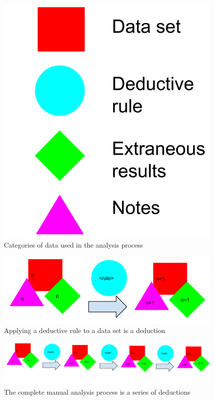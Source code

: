 \begin{figure}
  \includegraphics[scale=0.6]{figures/data_key}
  \caption{Categories of data used in the analysis process}
  \label{data_key}
\end{figure}

\begin{figure}
  \includegraphics[scale=0.5]{figures/deduction}
  \caption{Applying a deductive rule to a data set is a deduction}
  \label{deduction}
\end{figure}

\begin{figure}
  \includegraphics[scale=0.25]{figures/deductive_process}
  \caption{The complete manual analysis process is a series of deductions}
  \label{deductive_process}
\end{figure}

